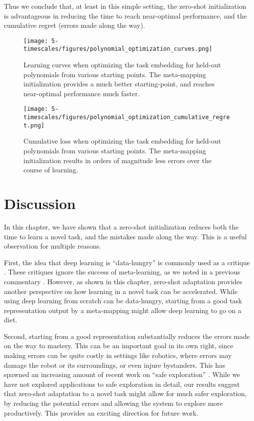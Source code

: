 Thus we conclude that, at least in this simple setting, the zero-shot initialization is advantageous in reducing the time to reach near-optimal performance, and the cumulative regret (errors made along the way). \par 
\begin{figure}
\centering
\texttt{[image: 5-timescales/figures/polynomial\_optimization\_curves.png]}
\caption{Learning curves when optimizing the task embedding for held-out polynomials from various starting points. The meta-mapping initialization provides a much better starting-point, and reaches near-optimal performance much faster.} \label{fig:timescales_polynomial_optimization_curves}
\end{figure}

\begin{figure}
\centering
\texttt{[image: 5-timescales/figures/polynomial\_optimization\_cumulative\_regret.png]}
\caption{Cumulative loss when optimizing the task embedding for held-out polynomials from various starting points. The meta-mapping initialization results in orders of magnitude less errors over the course of learning.} \label{fig:timescales_polynomial_optimization_regret}
\end{figure}

\section{Discussion}
In this chapter, we have shown that a zero-shot initialization reduces both the time to learn a novel task, and the mistakes made along the way. This is a useful observation for multiple reasons. \par 
First, the idea that deep learning is ``data-hungry'' is commonly used as a critique \citep[e.g.]{Lake2016, Marcus2018}. These critiques ignore the success of meta-learning, as we noted in a previous commentary \citep{Hansen2017}. However, as shown in this chapter, zero-shot adaptation provides another perspective on how learning in a novel task can be accelerated. While using deep learning from scratch can be data-hungry, starting from a good task representation output by a meta-mapping might allow deep learning to go on a diet. \par  
Second, starting from a good representation substantially reduces the errors made on the way to mastery. This can be an important goal in its own right, since making errors can be quite costly in settings like robotics, where errors may damage the robot or its surroundings, or even injure bystanders. This has spawned an increasing amount of recent work on ``safe exploration'' \citep[e.g.][]{Turchetta2016, Turchetta2019}. While we have not explored applications to safe exploration in detail, our results suggest that zero-shot adaptation to a novel task might allow for much safer exploration, by reducing the potential errors and allowing the system to explore more productively. This provides an exciting direction for future work. \par  


